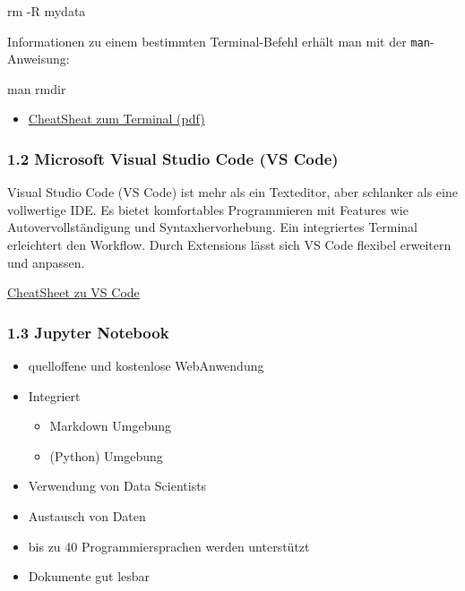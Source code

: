 \documentclass[
  11pt,
  a4paper,
  DIV=11,
  numbers=noendperiod]{scrartcl}
\newenvironment{Shaded}{\begin{snugshade}}{\end{snugshade}}
\newcommand{\NormalTok}[1]{\textcolor[rgb]{0.00,0.23,0.31}{#1}}
\newcommand{\OperatorTok}[1]{\textcolor[rgb]{0.37,0.37,0.37}{#1}}
\providecommand{\tightlist}{%
  \setlength{\itemsep}{0pt}\setlength{\parskip}{0pt}}\usepackage{longtable,booktabs,array}
\begin{document}
\begin{Shaded}
\begin{Highlighting}[numbers=left,,]
\NormalTok{rm }\OperatorTok{{-}}\NormalTok{R mydata}
\end{Highlighting}
\end{Shaded}

Informationen zu einem bestimmten Terminal-Befehl erhält man mit der
\texttt{man}-Anweisung:

\begin{Shaded}
\begin{Highlighting}[numbers=left,,]
\NormalTok{man rmdir}
\end{Highlighting}
\end{Shaded}

\begin{itemize}
\tightlist
\item
  \href{1_Programming_Introduction/1_Python_Programming/1-1_Setup/1-1_Setup.ipynb}{CheatSheat
  zum Terminal (pdf)}
\end{itemize}

\subsubsection{1.2 Microsoft Visual Studio Code (VS
Code)}\label{microsoft-visual-studio-code-vs-code}

Visual Studio Code (VS Code) ist mehr als ein Texteditor, aber schlanker
als eine vollwertige IDE. Es bietet komfortables Programmieren mit
Features wie Autovervollständigung und Syntaxhervorhebung. Ein
integriertes Terminal erleichtert den Workflow. Durch Extensions lässt
sich VS Code flexibel erweitern und anpassen.

\href{1_Programming_Introduction/1_Python_Programming/1-1_Setup/1-1_CheatSheet_VSCode.pdf}{CheatSheet
zu VS Code}

\subsubsection{1.3 Jupyter Notebook}\label{jupyter-notebook}

\begin{itemize}
\tightlist
\item
  quelloffene und kostenlose WebAnwendung
\item
  Integriert

  \begin{itemize}
  \tightlist
  \item
    Markdown Umgebung
  \item
    (Python) Umgebung
  \end{itemize}
\item
  Verwendung von Data Scientists
\item
  Austausch von Daten
\item
  bis zu 40 Programmiersprachen werden unterstützt
\item
  Dokumente gut lesbar
\end{itemize}
\end{document}
